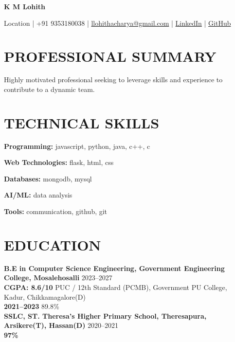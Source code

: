 \documentclass[10pt,a4paper]{article}
\begin{document}

\begin{center}

{\LARGE \textbf{K M Lohith}}

\vspace{2pt}

Location |
+91 9353180038 |
\href{mailto:llohithacharya@gmail.com}{llohithacharya@gmail.com} |
\href{https://linkedin.com/in/username}{LinkedIn} |
\href{https://github.com/username}{GitHub}

\end{center}


\section*{PROFESSIONAL SUMMARY}

Highly motivated professional seeking to leverage skills and experience to contribute to a dynamic team.


\section*{TECHNICAL SKILLS}

\textbf{Programming:} javascript, python, java, c++, c

\textbf{Web Technologies:} flask, html, css

\textbf{Databases:} mongodb, mysql

\textbf{AI/ML:} data analysis

\textbf{Tools:} communication, github, git


\section*{EDUCATION}

\noindent \textbf{B.E in Computer Science Engineering, Government Engineering College, Mosalehosalli} \hfill 2023–2027\vspace{5pt}\\
\noindent \textbf{CGPA: 8.6/10} \hfill PUC / 12th Standard (PCMB), Government PU College, Kadur, Chikkamagalore(D)\vspace{5pt}\\
\noindent \textbf{2021–2023} \hfill 89.8\%\vspace{5pt}\\
\noindent \textbf{SSLC, ST. Theresa’s Higher Primary School, Theresapura, Arsikere(T), Hassan(D)} \hfill 2020–2021\vspace{5pt}\\
\noindent \textbf{97\%} \hfill \vspace{5pt}\\
\end{document}
